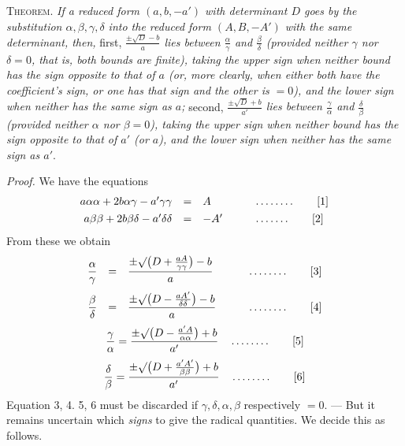 
\textsc{Theorem.} \textit{If a reduced form $(a,b,-a')$ with determinant $D$ goes by the substitution $\alpha,\beta,\gamma,\delta$ into the reduced form $(A,B,-A')$ with the same determinant, then,} first, \textit{$\frac{\pm\surd D-b}{a}$ lies between $\frac{\alpha}{\gamma}$ and $\frac{\beta}{\delta}$ (provided neither $\gamma$ nor $\delta=0$, that is, both bounds are finite), taking the upper sign when neither bound has the sign opposite to that of $a$ (or, more clearly, when either both have the coefficient's sign, or one has that sign and the other is $=0$), and the lower sign when neither has the same sign as $a$;} second, \textit{$\frac{\pm\surd D+b}{a'}$ lies between $\frac{\gamma}{\alpha}$ and $\frac{\delta}{\beta}$ (provided neither $\alpha$ nor $\beta=0$), taking the upper sign when neither bound has the sign opposite to that of $a'$ (or $a$), and the lower sign when neither has the same sign as $a'$}.

\textit{Proof.} We have the equations
\[
\begin{array}{rcll}
a\alpha\alpha+2b\alpha\gamma-a'\gamma\gamma&=&A&\qquad\mathinner{\ldotp\ldotp\ldotp\ldotp\ldotp\ldotp\ldotp\ldotp}\qquad[1]\\[4pt]
a\beta\beta+2b\beta\delta-a'\delta\delta&=&-A'&\qquad\mathinner{\ldotp\ldotp\ldotp\ldotp\ldotp\ldotp\ldotp}\qquad[2]
\end{array}
\]
From these we obtain
\[
\begin{array}{rcll}
\dfrac{\alpha}{\gamma}&=&\dfrac{\pm\surd\bigl(D+\frac{aA}{\gamma\gamma}\bigr)-b}{{a}}&\qquad\mathinner{\ldotp\ldotp\ldotp\ldotp\ldotp\ldotp\ldotp\ldotp}\qquad[3]\\[12pt]
\dfrac{\beta}{\delta}&=&\dfrac{\pm\surd\bigl(D-\frac{aA'}{\delta\delta}\bigr)-b}{a}&\qquad\mathinner{\ldotp\ldotp\ldotp\ldotp\ldotp\ldotp\ldotp\ldotp}\qquad[4]
\end{array}
\]
\begin{equation*}
\frac{\gamma}{\alpha}=\frac{\pm\surd\bigl(D-\frac{a'A}{\alpha\alpha}\bigr)+b}{a'}
\quad \mathinner{\ldotp\ldotp\ldotp\ldotp\ldotp\ldotp\ldotp\ldotp} \tag*{[5]}
\end{equation*}
\begin{equation*}
\frac{\delta}{\beta}=\frac{\pm\surd\bigl(D+\frac{a'A'}{\beta\beta}\bigr)+b}{a'}
\quad \mathinner{\ldotp\ldotp\ldotp\ldotp\ldotp\ldotp\ldotp\ldotp} \tag*{[6]}
\end{equation*}
Equation 3, 4. 5, 6 must be discarded if $\gamma,\delta,\alpha,\beta$ respectively $=0$. --- But it remains uncertain which \textit{signs} to give the radical quantities. We decide this as follows.

